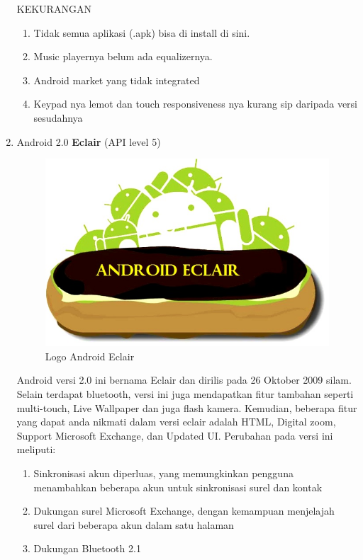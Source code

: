\begin{enumerate}
KEKURANGAN\\
\begin{enumerate}
    \item Tidak semua aplikasi (.apk) bisa di install di sini.
    \item Music playernya belum ada equalizernya.
    \item Android market yang tidak integrated
    \item Keypad nya lemot dan touch responsiveness nya kurang sip daripada versi sesudahnya
\end{enumerate}


\item Android 2.0 \textbf{Eclair} (API level 5)\\
\begin{figure}[]
    \centering
    \includegraphics[scale=0.3]{pictures/android-eclair.jpg}
    \caption{Logo Android Eclair}
    \label{}
\end{figure}
Android versi 2.0 ini bernama Eclair dan dirilis pada 26 Oktober 2009 silam. Selain terdapat bluetooth, versi ini juga mendapatkan fitur tambahan seperti multi-touch, Live Wallpaper dan juga flash kamera. Kemudian, beberapa fitur yang dapat anda nikmati dalam versi eclair adalah HTML, Digital zoom, Support Microsoft Exchange, dan Updated UI. Perubahan pada versi ini meliputi:
\begin{enumerate}
    \item Sinkronisasi akun diperluas, yang memungkinkan pengguna menambahkan beberapa akun untuk sinkronisasi surel dan kontak
    \item Dukungan surel Microsoft Exchange, dengan kemampuan menjelajah surel dari beberapa akun dalam satu halaman
    \item Dukungan Bluetooth 2.1

\end{enumerate}
\end{enumerate}

